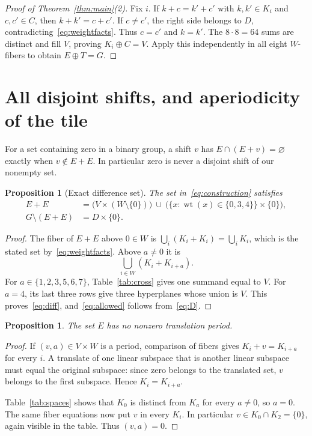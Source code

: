 \documentclass[11pt]{article}
\newtheorem{proposition}[theorem]{Proposition}
\theoremstyle{definition}\newtheorem{definition}[theorem]{Definition}
\theoremstyle{remark}\newtheorem{remark}[theorem]{Remark}
\newcommand{\wt}{\operatorname{wt}}
\begin{document}
\begin{proof}[Proof of Theorem~\ref{thm:main}(2)]
Fix $i$. If $k+c=k'+c'$ with $k,k'\in K_i$ and $c,c'\in C$, then
$k+k'=c+c'$. If $c\ne c'$, the right side belongs to $D$, contradicting~\eqref{eq:weightfacts}. Thus $c=c'$ and $k=k'$. The $8\cdot8=64$ sums are distinct and fill $V$, proving $K_i\oplus C=V$. Apply this independently in all eight $W$-fibers to obtain $E\oplus T=G$.
\end{proof}

\section{All disjoint shifts, and aperiodicity of the tile}

For a set containing zero in a binary group, a shift $v$ has $E\cap(E+v)=\varnothing$ exactly when $v\notin E+E$. In particular zero is never a disjoint shift of our nonempty set.

\begin{proposition}[Exact difference set]\label{prop:diff}
The set in~\eqref{eq:construction} satisfies
\begin{align}
E+E
 &=\bigl(V\times(W\setminus\{0\})\bigr)
   \ \cup\ \bigl(\{x:\wt(x)\in\{0,3,4\}\}\times\{0\}\bigr),\label{eq:diff}\\
G\setminus(E+E)&=D\times\{0\}.\label{eq:allowed}
\end{align}
\end{proposition}

\begin{proof}
The fiber of $E+E$ above $0\in W$ is $\bigcup_i(K_i+K_i)=\bigcup_iK_i$, which is the stated set by~\eqref{eq:weightfacts}. Above $a\ne0$ it is
\[
\bigcup_{i\in W}(K_i+K_{i+a}).
\]
For $a\in\{1,2,3,5,6,7\}$, Table~\ref{tab:cross} gives one summand equal to $V$. For $a=4$, its last three rows give three hyperplanes whose union is $V$. This proves~\eqref{eq:diff}, and~\eqref{eq:allowed} follows from~\eqref{eq:D}.
\end{proof}

\begin{proposition}\label{prop:aperiodic}
The set $E$ has no nonzero translation period.
\end{proposition}

\begin{proof}
If $(v,a)\in V\times W$ is a period, comparison of fibers gives
$K_i+v=K_{i+a}$ for every $i$. A translate of one linear subspace that is another linear subspace must equal the original subspace: since zero belongs to the translated set, $v$ belongs to the first subspace. Hence $K_i=K_{i+a}$.

Table~\ref{tab:spaces} shows that $K_0$ is distinct from $K_a$ for every $a\ne0$, so $a=0$. The same fiber equations now put $v$ in every $K_i$. In particular $v\in K_0\cap K_2=\{0\}$, again visible in the table. Thus $(v,a)=0$.
\end{proof}
\end{document}

